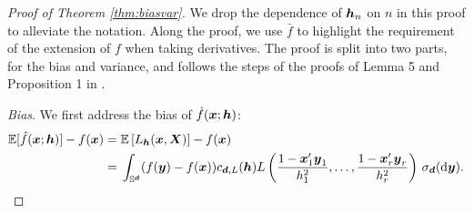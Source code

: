 \documentclass[oneside,11pt]{article}
\begin{document}
\begin{proof}[Proof of Theorem \ref{thm:biasvar}]
We drop the dependence of ${\boldsymbol{h}}_n$ on $n$ in this proof to alleviate the notation. Along the proof, we use $\bar{f}$ to highlight the requirement of the extension of $f$ when taking derivatives. The proof is split into two parts, for the bias and variance, and follows the steps of the proofs of Lemma 5 and Proposition 1 in \cite{Garcia-Portugues2013b}.

\textit{Bias}. We first address the bias of $\hat{f}(\boldsymbol{x};{\boldsymbol{h}})$:
\begin{align}
	\mathbb{E}[\hat{f}(\boldsymbol{x};{\boldsymbol{h}})]-f(\boldsymbol{x})
    =&\;
	\mathbb{E}\left[L_{{\boldsymbol{h}}}(\boldsymbol{x},\boldsymbol{X})\right]-f(\boldsymbol{x})\nonumber\\
	=&\;\int_{\mathbb{S}^{\boldsymbol{d}}}(f(\boldsymbol{y})-f(\boldsymbol{x}))c_{\boldsymbol{d},L}({\boldsymbol{h}})L\left(\frac{1-\boldsymbol{x}_1' \boldsymbol{y}_1}{h_1^2},\ldots, \frac{1-\boldsymbol{x}_r' \boldsymbol{y}_r}{h_r^2}\right)\,\sigma_{\boldsymbol{d}}(\mathrm{d}\boldsymbol{y}).\label{eq:bias0}
\end{align}


\end{proof}
\end{document}
